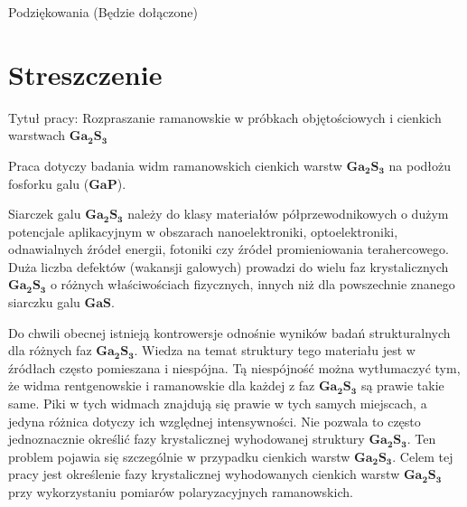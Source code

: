 \pagestyle{empty}
Podziękowania (Będzie dołączone)

\vspace{10cm}



\newpage

\section*{Streszczenie}

Tytuł pracy: Rozpraszanie ramanowskie w próbkach objętościowych i cienkich warstwach $\mathbf{Ga_{2}S_{3}}$

\vspace{10mm}

Praca dotyczy badania widm ramanowskich cienkich warstw $\mathbf{Ga_{2}S_{3}}$ na podłożu fosforku galu ($\mathbf{GaP}$).

Siarczek galu $\mathbf{Ga_{2}S_{3}}$ należy do klasy materiałów półprzewodnikowych o dużym potencjale aplikacyjnym w obszarach nanoelektroniki, optoelektroniki, odnawialnych źródeł energii, fotoniki czy źródeł promieniowania terahercowego. Duża liczba defektów (wakansji galowych) prowadzi do wielu faz krystalicznych $\mathbf{Ga_{2}S_{3}}$ o różnych właściwościach fizycznych, innych niż dla powszechnie znanego siarczku galu $\mathbf{GaS}$.

Do chwili obecnej istnieją kontrowersje odnośnie wyników badań strukturalnych dla różnych faz $\mathbf{Ga_{2}S_{3}}$. Wiedza na temat struktury tego materiału jest w źródłach często pomieszana i niespójna. Tą niespójność można wytłumaczyć tym, że widma rentgenowskie i ramanowskie dla każdej z faz $\mathbf{Ga_{2}S_{3}}$ są prawie takie same. Piki w tych widmach znajdują się prawie w tych samych miejscach, a jedyna różnica dotyczy ich względnej intensywności. Nie pozwala to często jednoznacznie określić fazy krystalicznej wyhodowanej struktury $\mathbf{Ga_{2}S_{3}}$. Ten problem pojawia się szczególnie w przypadku cienkich warstw $\mathbf{Ga_{2}S_{3}}$. Celem tej pracy jest określenie fazy krystalicznej wyhodowanych cienkich warstw $\mathbf{Ga_{2}S_{3}}$ przy wykorzystaniu pomiarów polaryzacyjnych ramanowskich.

